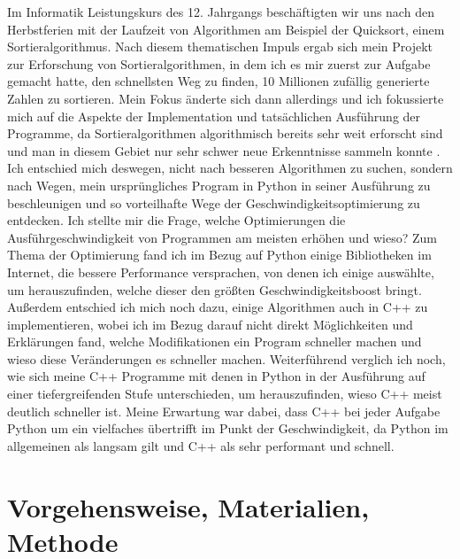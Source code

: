 \documentclass[12pt,a4paper]{article}
\begin{document}
Im Informatik Leistungskurs des 12. Jahrgangs beschäftigten wir uns nach den Herbstferien mit
der Laufzeit von Algorithmen am Beispiel der Quicksort, einem Sortieralgorithmus.
Nach diesem thematischen Impuls ergab sich mein Projekt zur Erforschung von Sortieralgorithmen,
in dem ich es mir zuerst zur Aufgabe gemacht hatte, den schnellsten Weg zu finden, 10 Millionen zufällig
generierte Zahlen zu sortieren. Mein Fokus änderte sich dann allerdings und ich fokussierte mich
auf die Aspekte der Implementation und tatsächlichen Ausführung der Programme, da 
Sortieralgorithmen algorithmisch bereits sehr weit erforscht sind und man in diesem Gebiet nur
sehr schwer neue Erkenntnisse sammeln konnte \cite{sortieralgorithmenwikipedia}.
Ich entschied mich deswegen, nicht nach besseren Algorithmen zu suchen, sondern nach Wegen, 
mein ursprüngliches Program in Python in seiner Ausführung zu beschleunigen und so vorteilhafte
Wege der Geschwindigkeitsoptimierung zu entdecken.
Ich stellte mir die Frage, welche Optimierungen die Ausführgeschwindigkeit von Programmen
am meisten erhöhen und wieso?
Zum Thema der Optimierung fand ich im Bezug auf Python einige Bibliotheken im Internet, die
bessere Performance versprachen, von denen ich einige auswählte, um herauszufinden,
welche dieser den größten Geschwindigkeitsboost bringt.
Außerdem entschied ich mich noch dazu, einige Algorithmen auch in C++ zu implementieren, wobei ich im Bezug 
darauf nicht direkt Möglichkeiten und Erklärungen fand, welche Modifikationen ein Program schneller machen und
wieso diese Veränderungen es schneller machen.
Weiterführend verglich ich noch, wie sich meine C++ Programme mit denen in Python in der Ausführung auf einer
tiefergreifenden Stufe unterschieden, um herauszufinden, wieso C++ meist deutlich schneller ist.
Meine Erwartung war dabei, dass C++ bei jeder Aufgabe Python um ein vielfaches übertrifft im Punkt der Geschwindigkeit,
da Python im allgemeinen als langsam gilt und C++ als sehr performant und schnell.

\clearpage

\section{Vorgehensweise, Materialien, Methode}
\end{document}
